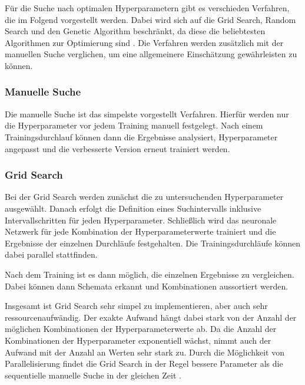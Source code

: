 Für die Suche nach optimalen Hyperparametern gibt es verschieden Verfahren, die im Folgend vorgestellt werden.
Dabei wird sich auf die Grid Search, Random Search und den Genetic Algorithm beschränkt, da diese die beliebtesten Algorithmen zur Optimierung sind \cite{hyperparameters-search-comparison-focus-genetic}.
Die Verfahren werden zusätzlich mit der manuellen Suche verglichen, um eine allgemeinere Einschätzung gewährleisten zu können.

\subsubsection{Manuelle Suche}
Die manuelle Suche ist das simpelste vorgestellt Verfahren.
Hierfür werden nur die Hyperparameter vor jedem Training manuell festgelegt.
Nach einem Trainingsdurchlauf können dann die Ergebnisse analysiert, Hyperparameter angepasst und die verbesserte Version erneut trainiert werden.


\subsubsection{Grid Search}
Bei der Grid Search \cite{hyperparameters-grid-search} werden zunächst die zu untersuchenden Hyperparameter ausgewählt.
Danach erfolgt die Definition eines Suchintervalls inklusive Intervallschritten für jeden Hyperparameter.
Schließlich wird das neuronale Netzwerk für jede Kombination der Hyperparameterwerte trainiert und die Ergebnisse der einzelnen Durchläufe festgehalten.
Die Trainingsdurchläufe können dabei parallel stattfinden.

Nach dem Training ist es dann möglich, die einzelnen Ergebnisse zu vergleichen.
Dabei können dann Schemata erkannt und Kombinationen aussortiert werden.
\newline

Insgesamt ist Grid Search sehr simpel zu implementieren, aber auch sehr ressourcenaufwändig.
Der exakte Aufwand hängt dabei stark von der Anzahl der möglichen Kombinationen der Hyperparameterwerte ab.
Da die Anzahl der Kombinationen der Hyperparameter exponentiell  wächst, nimmt auch der Aufwand mit der Anzahl an Werten sehr stark zu.
Durch die Möglichkeit von Parallelisierung findet die Grid Search in der Regel bessere Parameter als die sequentielle manuelle Suche in der gleichen Zeit \cite{hyperparameters-random-search}.

